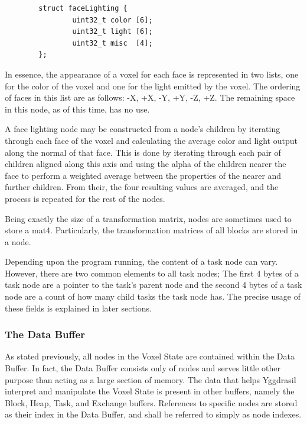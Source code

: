 \documentclass[onecolumn, draftclsnofoot,10pt, compsoc]{IEEEtran}
\newcounter{threesection}[subsubsection]
\begin{document}
\begin{verbatim}
        struct faceLighting {
                uint32_t color [6];
                uint32_t light [6];
                uint32_t misc  [4];
        };
\end{verbatim}

In essence, the appearance of a voxel for each face is represented in two lists, one for the color of the voxel and one for the light emitted by the voxel. The ordering of faces in this list are as follows: -X, +X, -Y, +Y, -Z, +Z. The remaining space in this node, as of this time, has no use.

A face lighting node may be constructed from a node’s children by iterating through each face of the voxel and calculating the average color and light output along the normal of that face. This is done by iterating through each pair of children aligned along this axis and using the alpha of the children nearer the face to perform a weighted average between the properties of the nearer and further children. From their, the four resulting values are averaged, and the process is repeated for the rest of the nodes.


Being exactly the size of a transformation matrix, nodes are sometimes used to store a mat4. Particularly, the transformation matrices of all blocks are stored in a node.


Depending upon the program running, the content of a task node can vary. However, there are two common elements to all task nodes; The first 4 bytes of a task node are a pointer to the task’s parent node and the second 4 bytes of a task node are a count of how many child tasks the task node has. The precise usage of these fields is explained in later sections.


\subsubsection{The Data Buffer} 

As stated previously, all nodes in the Voxel State are contained within the Data Buffer. In fact, the Data Buffer consists only of nodes and serves little other purpose than acting as a large section of memory. The data that helps Yggdrasil interpret and manipulate the Voxel State is present in other buffers, namely the Block, Heap, Task, and Exchange buffers. References to specific nodes are stored as their index in the Data Buffer, and shall be referred to simply as node indexes.
\end{document}
